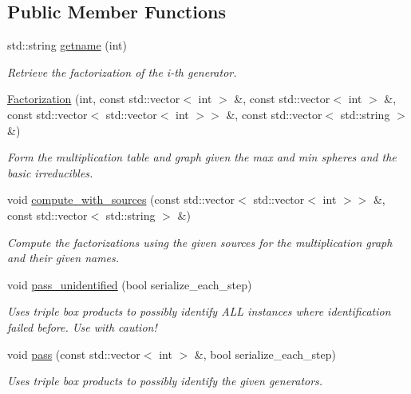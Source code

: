 \subsection*{Public Member Functions}
\begin{DoxyCompactItemize}
\item 
std\+::string \hyperlink{classMackey_1_1Factorization_ac5088227511baaaec1f62802b75d3a9e}{getname} (int)
\begin{DoxyCompactList}\small\item\em Retrieve the factorization of the i-\/th generator. \end{DoxyCompactList}\item 
\hyperlink{classMackey_1_1Factorization_af1b07ab5021c4e51698c4cd3fbb85422}{Factorization} (int, const std\+::vector$<$ int $>$ \&, const std\+::vector$<$ int $>$ \&, const std\+::vector$<$ std\+::vector$<$ int $>$$>$ \&, const std\+::vector$<$ std\+::string $>$ \&)
\begin{DoxyCompactList}\small\item\em Form the multiplication table and graph given the max and min spheres and the basic irreducibles. \end{DoxyCompactList}\item 
void \hyperlink{classMackey_1_1Factorization_a2e135a37687fc3d69cd16a8729dd19eb}{compute\+\_\+with\+\_\+sources} (const std\+::vector$<$ std\+::vector$<$ int $>$$>$ \&, const std\+::vector$<$ std\+::string $>$ \&)
\begin{DoxyCompactList}\small\item\em Compute the factorizations using the given sources for the multiplication graph and their given names. \end{DoxyCompactList}\item 
void \hyperlink{classMackey_1_1Factorization_a0f1115a0af9f4fb294646aee85ebb2e4}{pass\+\_\+unidentified} (bool serialize\+\_\+each\+\_\+step)
\begin{DoxyCompactList}\small\item\em Uses triple box products to possibly identify A\+LL instances where identification failed before. Use with caution! \end{DoxyCompactList}\item 
void \hyperlink{classMackey_1_1Factorization_a9828268663049b5ac2668d4eb0bdd4ff}{pass} (const std\+::vector$<$ int $>$ \&, bool serialize\+\_\+each\+\_\+step)
\begin{DoxyCompactList}\small\item\em Uses triple box products to possibly identify the given generators. \end{DoxyCompactList}\item 

\end{DoxyCompactItemize}
